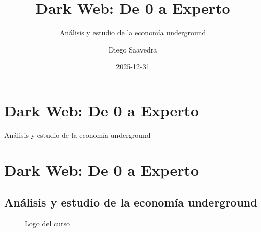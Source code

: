 \documentclass[
  letterpaper,
]{report}
\title{Dark Web: De 0 a Experto}
\subtitle{Análisis y estudio de la economía underground}
\author{Diego Saavedra}
\date{2025-12-31}
\makeatletter
\newcommand*\pandocbounded[1]{%
  \sbox\pandoc@box{#1}%
  \Gscale@div\@tempa{\textheight}{\dimexpr\ht\pandoc@box+\dp\pandoc@box\relax}%
  \Gscale@div\@tempb{\linewidth}{\wd\pandoc@box}%
  \ifdim\@tempb\p@<\@tempa\p@\let\@tempa\@tempb\fi%
  \ifdim\@tempa\p@<\p@\scalebox{\@tempa}{\usebox\pandoc@box}%
  \else\usebox{\pandoc@box}%
  \fi%
}
\renewcommand*\contentsname{Table of contents}
\newcommand\contentsname{Table of contents}
\makeatother
\begin{document}
\maketitle

\renewcommand*\contentsname{Table of contents}
{
\setcounter{tocdepth}{2}
\tableofcontents
}


\chapter{Dark Web: De 0 a Experto}\label{dark-web-de-0-a-experto}

Análisis y estudio de la economía underground

\hfill\break


\chapter{Dark Web: De 0 a Experto}\label{dark-web-de-0-a-experto-1}

\section{Análisis y estudio de la economía
underground}\label{anuxe1lisis-y-estudio-de-la-economuxeda-underground}

\begin{figure}[H]

{\centering \pandocbounded{}

}

\caption{Logo del curso}

\end{figure}%
\end{document}
